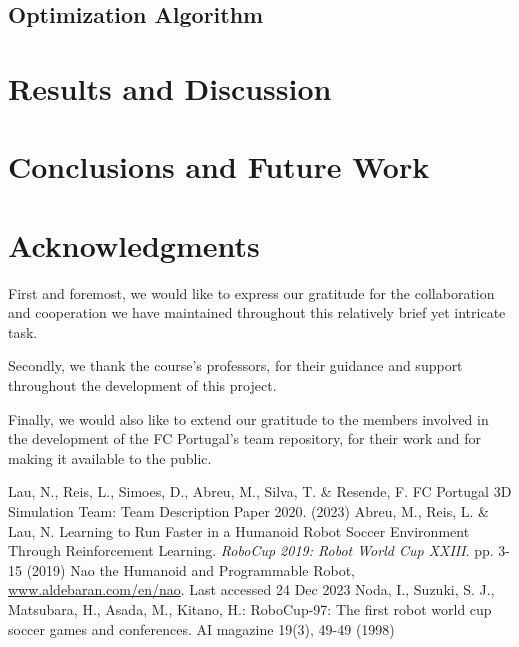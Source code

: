 \documentclass[conference]{IEEEtran}
\begin{document}
\subsection{Optimization Algorithm}\label{Optimization Algorithm}




\section{Results and Discussion}\label{Results and Discussion}

\section{Conclusions and Future Work}\label{Conclusions and Future Work}

\section{Acknowledgments}\label{Acknowledgments}

First and foremost, we would like to express our gratitude for the collaboration and cooperation we have maintained throughout this relatively brief yet intricate task.

Secondly, we thank the course's professors, for their guidance and support throughout the development
of this project.

Finally, we would also like to extend our gratitude to the members involved in the development of the FC Portugal's team repository, for their work and for making it available to the public.

\begin{thebibliography}{00}
    Lau, N., Reis, L., Simoes, D., Abreu, M., Silva, T. \& Resende, F. FC Portugal 3D Simulation Team: Team Description Paper 2020.  (2023)
    Abreu, M., Reis, L. \& Lau, N. Learning to Run Faster in a Humanoid Robot Soccer Environment Through Reinforcement Learning. {\em RoboCup 2019: Robot World Cup XXIII}. pp. 3-15 (2019)
     Nao the Humanoid and Programmable Robot, \href{www.aldebaran.com/en/nao}{www.aldebaran.com/en/nao}. Last accessed 24 Dec 2023
     Noda, I., Suzuki, S. J., Matsubara, H., Asada, M., Kitano, H.: RoboCup-97: The first robot world cup soccer games and conferences. AI magazine 19(3), 49-49 (1998)
\end{thebibliography}
\end{document}
